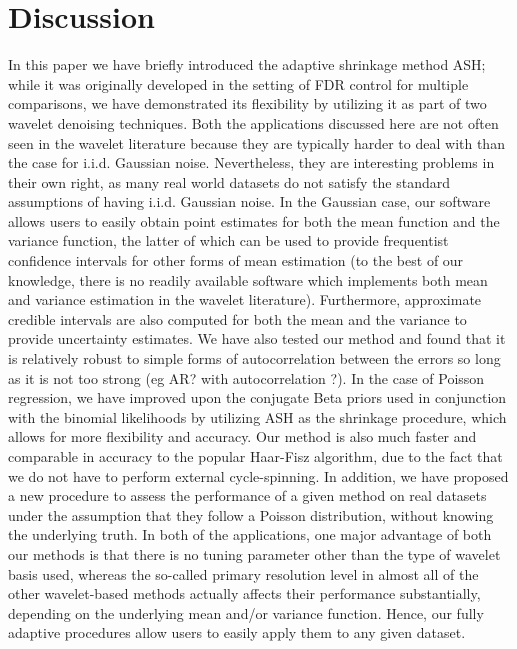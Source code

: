 \documentclass[12pt]{article}
\begin{document}
\section{Discussion}
In this paper we have briefly introduced the adaptive shrinkage method ASH; while it was originally developed in the setting of FDR control for multiple comparisons, we have demonstrated its flexibility by utilizing it as part of two wavelet denoising techniques. Both the applications discussed here are not often seen in the wavelet literature because they are typically harder to deal with than the case for i.i.d. Gaussian noise. Nevertheless, they are interesting problems in their own right, as many real world datasets do not satisfy the standard assumptions of having i.i.d. Gaussian noise. In the Gaussian case, our software allows users to easily obtain point estimates for both the mean function and the variance function, the latter of which can be used to provide frequentist confidence intervals for other forms of mean estimation (to the best of our knowledge, there is no readily available software which implements both mean and variance estimation in the wavelet literature). Furthermore, approximate credible intervals are also computed for both the mean and the variance to provide uncertainty estimates. We have also tested our method and found that it is relatively robust to simple forms of autocorrelation between the errors so long as it is not too strong (eg AR? with autocorrelation ?).  In the case of Poisson regression, we have improved upon the conjugate Beta priors used in conjunction with the binomial likelihoods by utilizing ASH as the shrinkage procedure, which allows for more flexibility and accuracy. Our method is also much faster and comparable in accuracy to the popular Haar-Fisz algorithm, due to the fact that we do not have to perform external cycle-spinning. In addition, we have proposed a new procedure to assess the performance of a given method on real datasets under the assumption that they follow a Poisson distribution, without knowing the underlying truth. In both of the applications, one major advantage of both our methods is that there is no tuning parameter other than the type of wavelet basis used, whereas the so-called primary resolution level in almost all of the other wavelet-based methods actually affects their performance substantially, depending on the underlying mean and/or variance function. Hence, our fully adaptive procedures allow users to easily apply them to any given dataset.\bigskip\\
\end{document}
